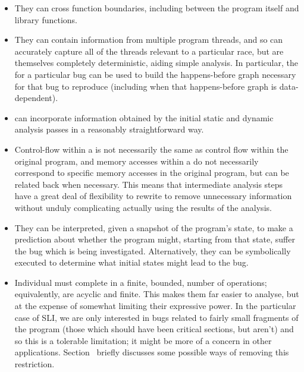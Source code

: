 \begin{itemize}
\item
  They can cross function boundaries, including between the program
  itself and library functions.
\item
  They can contain information from multiple program threads, and so
  can accurately capture all of the threads relevant to a particular
  race, but are themselves completely deterministic, aiding simple
  analysis.  In particular, the \StateMachine for a particular bug can
  be used to build the happens-before graph necessary for that bug to
  reproduce (including when that happens-before graph is
  data-dependent).
\item
  \STateMachines can incorporate information obtained by the initial
  static and dynamic analysis passes in a reasonably straightforward
  way.
\item
  Control-flow within a \StateMachine is not necessarily the same as
  control flow within the original program, and memory accesses within
  a \StateMachine do not necessarily correspond to specific memory
  accesses in the original program, but can be related back when
  necessary.  This means that intermediate analysis steps have a great
  deal of flexibility to rewrite \StateMachines to remove unnecessary
  information without unduly complicating actually using the results
  of the analysis.
\item
  They can be interpreted, given a snapshot of the program's state, to
  make a prediction about whether the program might, starting from
  that state, suffer the bug which is being investigated.
  Alternatively, they can be symbolically executed to determine what
  initial states might lead to the bug.
\item
  Individual \StateMachines must complete in a finite, bounded, number
  of operations; equivalently, \StateMachines are acyclic and finite.
  This makes them far easier to analyse, but at the expense of
  somewhat limiting their expressive power.  In the particular case of
  SLI, we are only interested in bugs related to fairly small
  fragments of the program (those which should have been critical
  sections, but aren't) and so this is a tolerable limitation; it
  might be more of a concern in other applications.
  Section~ briefly discusses some possible ways of removing
  this restriction.
\end{itemize}

